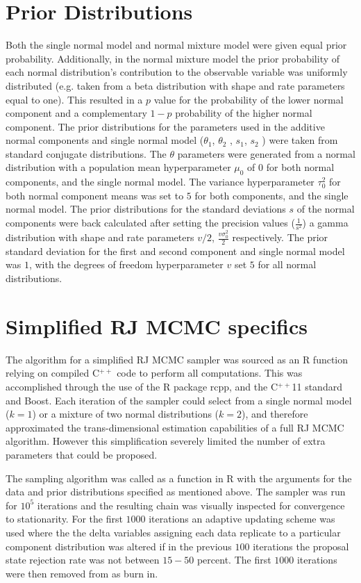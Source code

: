\documentclass[12pt]{article}
\begin{document}
\section*{Prior Distributions}
Both the single normal model and normal mixture model were given equal prior probability. Additionally, in the normal mixture model the prior probability of each normal distribution’s contribution to the observable variable was uniformly distributed (e.g. taken from a beta distribution with shape and rate parameters equal to one). This resulted in a $p$ value for the probability of the lower normal component and a complementary $1-p$ probability of the higher normal component.
The prior distributions for the parameters used in the additive normal components and single normal model ($\theta_1$, $\theta_2$ , $s_1$, $s_2$ ) were taken from standard conjugate distributions. The $\theta$ parameters were generated from a normal distribution with a population mean hyperparameter $\mu_0$ of $0$ for both normal components, and the single normal model. The variance hyperparameter $\tau_0^2$ for both normal component means was set to $5$ for both components, and the single normal model.
	The prior distributions for the standard deviations $s$ of the normal components were back calculated after setting the precision values ($\frac{1}{s^2}$)  a gamma distribution with shape and rate parameters $v/2$, $\frac{v\sigma_0^2}{2}$ respectively. The prior standard deviation for the first and second component and single normal model was $1$, with the degrees of freedom hyperparameter $v$ set $5$ for all normal distributions. 

\section*{Simplified RJ MCMC specifics}

The algorithm for a simplified RJ MCMC sampler was sourced as an R function relying on compiled C$^{++}$ code to perform all computations. This was accomplished through the use of the R package rcpp, and the C$^{++}$11 standard and Boost. Each iteration of the sampler could select from a single normal model ($k=1$) or a mixture of two normal distributions ($k=2$), and therefore approximated the trans-dimensional estimation capabilities of a full RJ MCMC algorithm. However this simplification severely limited the number of extra parameters that could be proposed.

The sampling algorithm was called as a function in R with the arguments for the data and prior distributions specified as mentioned above. The sampler was run for $10^5$ iterations and the resulting chain was visually inspected for convergence to stationarity.  For the first $1000$ iterations an adaptive updating scheme was used where the the delta variables assigning each data replicate to a particular component distribution was altered if in the previous $100$ iterations the proposal state rejection rate was not  between $15 - 50$ percent. The first $1000$ iterations were then removed from as burn in. 
\end{document}
